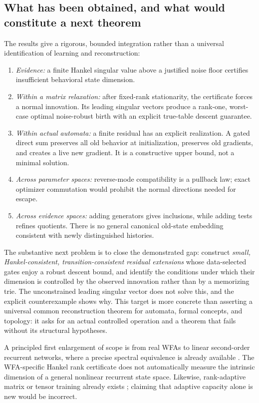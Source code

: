 \documentclass[11pt]{article}
\theoremstyle{definition}
\theoremstyle{remark}
\begin{document}
\subsection{What has been obtained, and what would constitute a next theorem}

The results give a rigorous, bounded integration rather than a universal
identification of learning and reconstruction:
\begin{enumerate}
\item \emph{Evidence:} a finite Hankel singular value above a justified
      noise floor certifies insufficient behavioral state dimension.
\item \emph{Within a matrix relaxation:} after fixed-rank stationarity,
      the certificate forces a normal innovation. Its leading singular
      vectors produce a rank-one, worst-case optimal noise-robust birth
      with an explicit true-table descent guarantee.
\item \emph{Within actual automata:} a finite residual has an explicit
      realization. A gated direct sum preserves all old behavior at
      initialization, preserves old gradients, and creates a live new
      gradient. It is a constructive upper bound, not a minimal solution.
\item \emph{Across parameter spaces:} reverse-mode compatibility is a
      pullback law; exact optimizer commutation would prohibit the normal
      directions needed for escape.
\item \emph{Across evidence spaces:} adding generators gives inclusions,
      while adding tests refines quotients. There is no general canonical
      old-state embedding consistent with newly distinguished histories.
\end{enumerate}

The substantive next problem is to close the demonstrated gap: construct
\emph{small, Hankel-consistent, transition-consistent residual extensions}
whose data-selected gates enjoy a robust descent bound, and identify the
conditions under which their dimension is controlled by the observed
innovation rather than by a memorizing trie. The unconstrained leading
singular vector does not solve this, and the explicit counterexample shows
why. This target is more concrete than asserting a universal common
reconstruction theorem for automata, formal concepts, and topology: it asks
for an actual controlled operation and a theorem that fails without its
structural hypotheses.

A principled first enlargement of scope is from real WFAs to linear
second-order recurrent networks, where a precise spectral equivalence is
already available \cite{ce:rabusseau2019}. The WFA-specific Hankel rank
certificate does not automatically measure the intrinsic dimension of a
general nonlinear recurrent state space. Likewise, rank-adaptive matrix or
tensor training already exists \cite{ce:tan2014,ce:lottery2022}; claiming
that adaptive capacity alone is new would be incorrect.
\end{document}
